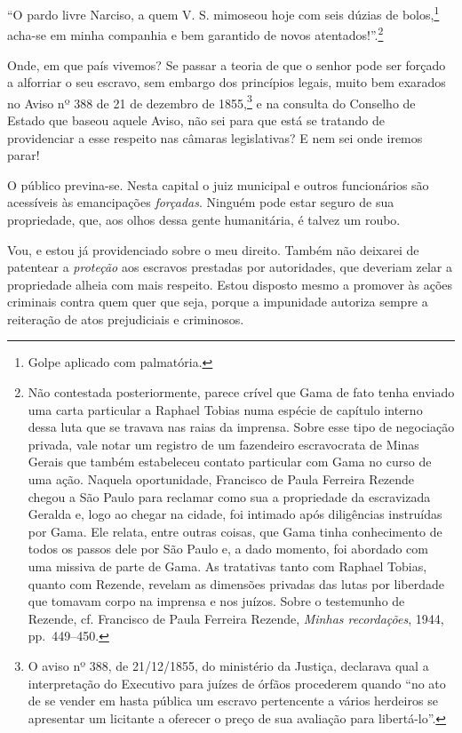 {``O pardo livre Narciso, a quem V. S. mimoseou hoje com seis dúzias de
bolos,\footnote{ Golpe aplicado com palmatória.} acha-se em minha
companhia e bem garantido de novos atentados!''.\footnote{ Não
  contestada posteriormente, parece crível que Gama de fato tenha
  enviado uma carta particular a Raphael Tobias numa espécie de capítulo
  interno dessa luta que se travava nas raias da imprensa. Sobre esse
  tipo de negociação privada, vale notar um registro de um fazendeiro
  escravocrata de Minas Gerais que também estabeleceu contato particular
  com Gama no curso de uma ação. Naquela oportunidade, Francisco de
  Paula Ferreira Rezende chegou a São Paulo para reclamar como sua a
  propriedade da escravizada Geralda e, logo ao chegar na cidade, foi
  intimado após diligências instruídas por Gama. Ele relata, entre
  outras coisas, que Gama tinha conhecimento de todos os passos dele por
  São Paulo e, a dado momento, foi abordado com uma missiva de parte de
  Gama. As tratativas tanto com Raphael Tobias, quanto com Rezende,
  revelam as dimensões privadas das lutas por liberdade que tomavam
  corpo na imprensa e nos juízos. Sobre o testemunho de Rezende, cf.
  Francisco de Paula Ferreira Rezende, \emph{Minhas recordações}, 1944,
  pp.~449--450.}

Onde, em que país vivemos? Se passar a teoria de que o senhor pode ser
forçado a alforriar o seu escravo, sem embargo dos princípios legais,
muito bem exarados no Aviso nº 388 de 21 de dezembro de 1855,\footnote{
  O aviso nº 388, de 21/12/1855, do ministério da Justiça, declarava
  qual a interpretação do Executivo para juízes de órfãos procederem
  quando ``no ato de se vender em hasta pública um escravo pertencente a
  vários herdeiros se apresentar um licitante a oferecer o preço de sua
  avaliação para libertá-lo''.} e na consulta do Conselho de Estado que
baseou aquele Aviso, não sei para que está se tratando de providenciar a
esse respeito nas câmaras legislativas? E nem sei onde iremos parar!

O público previna-se. Nesta capital o juiz municipal e outros
funcionários são acessíveis às emancipações \emph{forçadas}. Ninguém
pode estar seguro de sua propriedade, que, aos olhos dessa gente
humanitária, é talvez um roubo.

Vou, e estou já providenciado sobre o meu direito. Também não deixarei
de patentear a \emph{proteção} aos escravos prestadas por autoridades,
que deveriam zelar a propriedade alheia com mais respeito. Estou
disposto mesmo a promover às ações criminais contra quem quer que seja,
porque a impunidade autoriza sempre a reiteração de atos prejudiciais e
criminosos.

}
